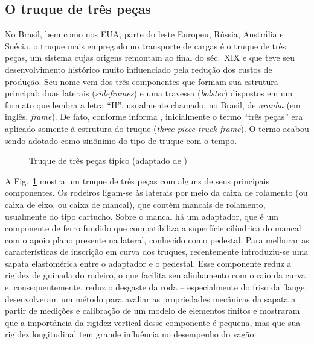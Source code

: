 \subsection{O truque de três peças \label{sec: tpt}}
No Brasil, bem como nos EUA, parte do leste Europeu, Rússia, Austrália e Suécia, o truque mais empregado no transporte de cargas é o truque de três peças, um sistema cujas origens remontam ao final do séc.~XIX e que teve seu desenvolvimento histórico muito influenciado pela redução dos custos de produção. Seu nome vem dos três componentes que formam sua estrutura principal: duas laterais (\textit{sideframes}) e uma travessa (\textit{bolster}) dispostos em um formato que lembra a letra ``H'', usualmente chamado, no Brasil, de \textit{aranha} (em inglês, \textit{frame}). De fato, conforme informa , inicialmente o termo ``três peças'' era aplicado somente à estrutura do truque (\textit{three-piece truck frame}). O termo acabou sendo adotado como sinônimo do tipo de truque com o tempo.

\begin{figure}[]
 \centering
 
 \caption{Truque de três peças típico (adaptado de )}
 \label{fig:3piece truck}
\end{figure}

A Fig.~\ref{fig:3piece truck} mostra um truque de três peças com alguns de seus principais componentes. Os rodeiros ligam-se às laterais por meio da caixa de rolamento (ou caixa de eixo, ou caixa de mancal), que contém mancais de rolamento, usualmente do tipo cartucho. Sobre o mancal há um adaptador, que é um componente de ferro fundido que compatibiliza a superfície cilíndrica do mancal com o apoio plano presente na lateral, conhecido como pedestal. Para melhorar as características de inscrição em curva dos truques, recentemente introduziu-se uma sapata elastomérica entre o adaptador e o pedestal. Esse componente reduz a rigidez de guinada do rodeiro, o que facilita seu alinhamento com o raio da curva e, consequentemente, reduz o desgaste da roda -- especialmente do friso da flange.  desenvolveram um método para avaliar as propriedades mecânicas da sapata a partir de medições e calibração de um modelo de elementos finitos e mostraram que a importância da rigidez vertical desse componente é pequena, mas que sua rigidez longitudinal tem grande influência no desempenho do vagão.

